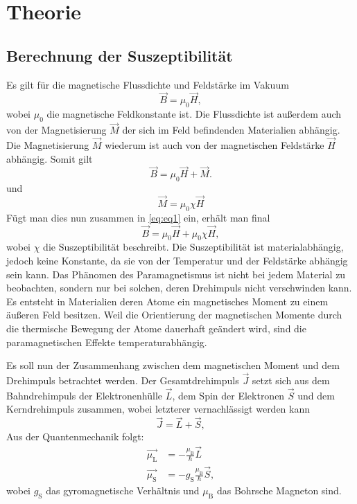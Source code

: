 \section{Theorie}
\label{sec:Theorie}
\subsection{Berechnung der Suszeptibilität}
\label{subsec: Berechnung}
Es gilt für die magnetische Flussdichte und Feldstärke im Vakuum
\begin{equation}
\label{eq:eq1}
\vec{B} = \mu_0 \vec{H},
\end{equation}
wobei $\mu_0$ die magnetische Feldkonstante ist. Die Flussdichte ist außerdem auch von der Magnetisierung $\vec{M}$ der sich im Feld befindenden Materialien abhängig. Die Magnetisierung
$\vec{M}$ wiederum ist auch von der magnetischen Feldstärke $\vec{H}$ abhängig. Somit gilt
\begin{equation}
\label{eq:eq2}
\vec{B} = \mu_0 \vec{H} + \vec{M}.
\end{equation}
und
\begin{equation}
\vec{M} = \mu_0 \chi \vec{H}
\end{equation}
Fügt man dies nun zusammen in \autoref{eq:eq1} ein, erhält man final
\begin{equation*}
\vec{B} = \mu_0 \vec{H} + \mu_0 \chi \vec{H},
\end{equation*}
wobei $\chi$ die Suszeptibilität beschreibt. Die Suszeptibilität ist materialabhängig, jedoch keine Konstante, da sie von der Temperatur und der Feldstärke abhängig sein kann. 
Das Phänomen des Paramagnetismus ist nicht bei jedem Material zu beobachten, sondern nur bei solchen, deren Drehimpuls nicht verschwinden kann.
Es entsteht in Materialien deren Atome ein magnetisches Moment zu einem äußeren Feld besitzen. Weil die Orientierung der magnetischen Momente durch die thermische Bewegung
der Atome dauerhaft geändert wird, sind die paramagnetischen Effekte temperaturabhängig.

Es soll nun der Zusammenhang zwischen dem magnetischen Moment und dem Drehimpuls betrachtet werden.
Der Gesamtdrehimpuls $\vec{J}$ setzt sich aus dem Bahndrehimpuls der Elektronenhülle $\vec{L}$, dem Spin der Elektronen $\vec{S}$ und dem Kerndrehimpuls zusammen, wobei letzterer vernachlässigt
werden kann
\begin{equation*}
\vec{J} = \vec{L} + \vec{S},
\end{equation*}
Aus der Quantenmechanik folgt:
\begin{align*}
\vec{\mu_\text{L}} &= -\frac{\mu_\text{B}}{\hbar}\vec{L} \\
\vec{\mu_\text{S}} &= -g_\text{S}\frac{\mu_\text{B}}{\hbar}\vec{S},
\end{align*}
wobei $g_\text{S}$ das gyromagnetische Verhältnis und $\mu_\text{B}$ das Bohrsche Magneton sind.

